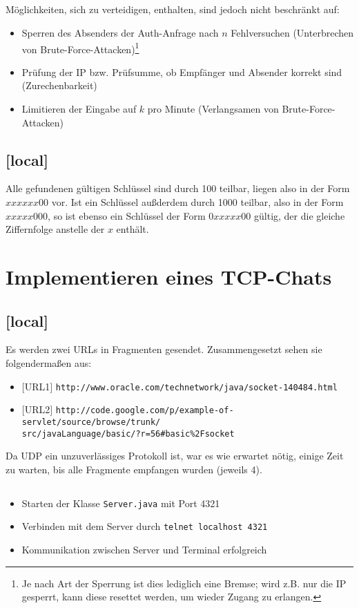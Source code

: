 \documentclass[twoside]{article}
\newcommand{\ttt}[1]{%
	\texttt{#1}%
}
\begin{document}
\subsection{}
Möglichkeiten, sich zu verteidigen, enthalten, sind jedoch nicht beschränkt auf:
\begin{itemize}
	\item Sperren des Absenders der Auth-Anfrage nach $n$ Fehlversuchen (Unterbrechen von Brute-Force-Attacken)\footnote{Je nach Art der Sperrung ist dies lediglich eine Bremse; wird z.B. nur die IP gesperrt, kann diese resettet werden, um wieder Zugang zu erlangen.}
	\item Prüfung der IP bzw. Prüfsumme, ob Empfänger und Absender korrekt sind (Zurechenbarkeit)
	\item Limitieren der Eingabe auf $k$ pro Minute (Verlangsamen von Brute-Force-Attacken)
\end{itemize}
\subsection{[local]}
Alle gefundenen gültigen Schlüssel sind durch 100 teilbar, liegen also in der Form $xxxxxx00$ vor.
Ist ein Schlüssel außderdem durch 1000 teilbar, also in der Form $xxxxx000$, so ist ebenso ein Schlüssel der Form $0xxxxx00$ gültig, der die gleiche Ziffernfolge anstelle der $x$ enthält.


\section{Implementieren eines TCP-Chats}
\subsection{[local]}
Es werden zwei URLs in Fragmenten gesendet.
Zusammengesetzt sehen sie folgendermaßen aus:
\begin{itemize}
	\item $[$URL1$]$ \texttt{http://www.oracle.com/technetwork/java/socket-140484.html}
	\item $[$URL2$]$ \texttt{http://code.google.com/p/example-of-servlet/source/browse/trunk/}\\\texttt{src/javaLanguage/basic/?r=56\#basic\%2Fsocket}
\end{itemize}
Da UDP ein unzuverlässiges Protokoll ist, war es wie erwartet nötig, einige Zeit zu warten, bis alle Fragmente empfangen wurden (jeweils 4).
\subsection{}
\begin{itemize}
	\item Starten der Klasse \ttt{Server.java} mit Port 4321
	\item Verbinden mit dem Server durch \ttt{telnet localhost 4321}
	\item Kommunikation zwischen Server und Terminal erfolgreich
\end{itemize}
\end{document}
